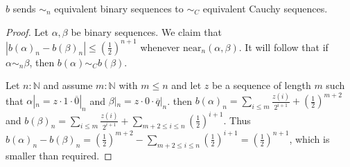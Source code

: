 \begin{lemma}
  $b$ sends $\sim_n$ equivalent binary sequences to $\sim_C$ equivalent Cauchy sequences. 
\end{lemma}
\begin{proof}
  Let $\alpha, \beta$ be binary sequences.
  We claim that $|b(\alpha)_n - b(\beta)_n| \leq (\frac12)^{n+1}$ 
  whenever $\text{near}_n(\alpha, \beta)$. 
  It will follow that if $\alpha\sim_n \beta$, then 
  $b(\alpha)\sim_C b(\beta)$. 

  Let $n:\mathbb N$ and assume $m:\mathbb N$ with $m\leq n$ and 
  let $z$ be a sequence of length $m$ such that 
  $\alpha|_n = z\cdot 1 \cdot \overline 0|_n$ and $\beta|_n = z \cdot 0 \cdot \overline q |_n$. 
  then $b(\alpha)_n = \sum_{i\leq m} \frac{z(i)}{2^{i+1}} + (\frac12)^{m+2}$ and 
  $b(\beta)_n = \sum_{i\leq m} \frac{z(i)}{2^{i+1}} + \sum\limits_{m+2 \leq i \leq n}(\frac12)^{i+1}$. 
  Thus 
  $b(\alpha)_n - b(\beta)_n = (\frac12)^{m+2} - \sum\limits_{m+2 \leq i \leq n}(\frac12)^{i+1} = 
  (\frac12)^{n+1}$, 
  which is smaller than required. 
\end{proof}  

